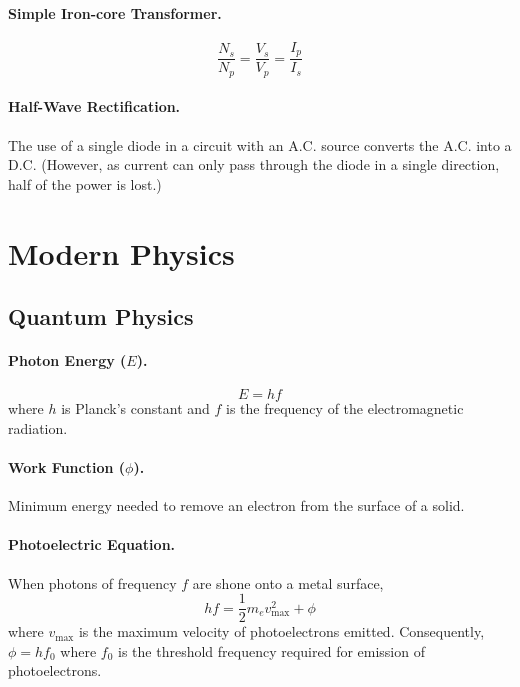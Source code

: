 \documentclass{article}
\begin{document}
\paragraph{Simple Iron-core Transformer.} \begin{equation} \frac{N_s}{N_p} =
\frac{V_s}{V_p} = \frac{I_p}{I_s} \end{equation}

\paragraph{Half-Wave Rectification.} The use of a single diode in a circuit with
an A.C. source converts the A.C. into a D.C. (However, as current can only pass
through the diode in a single direction, half of the power is lost.)

\section{Modern Physics}

\subsection{Quantum Physics}

\paragraph{Photon Energy ($E$).} \begin{equation} E = hf \end{equation} where
  $h$ is Planck's constant and $f$ is the frequency of the electromagnetic
  radiation.

\paragraph{Work Function ($\phi$).} Minimum energy needed to remove an electron
from the surface of a solid.

\paragraph{Photoelectric Equation.} When photons of frequency $f$ are shone onto
a metal surface, \begin{equation} hf = \frac{1}{2}m_ev_{\text{max}}^2 + \phi
\end{equation} where $v_{\text{max}}$ is the maximum velocity of photoelectrons
emitted. Consequently, $\phi = hf_0$ where $f_0$ is the threshold frequency
required for emission of photoelectrons.
\end{document}
